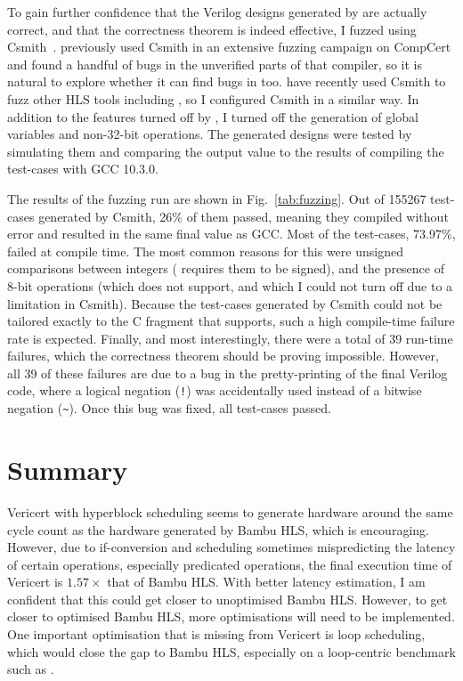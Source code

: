 \noindent To gain further confidence that the Verilog designs generated by
\vericert{} are actually correct, and that the correctness theorem is indeed
effective, I fuzzed \vericert{} using
Csmith~\cite{yang11_findin_under_bugs_c_compil}. \citeauthor{yang11_findin_under_bugs_c_compil}
previously used Csmith in an extensive fuzzing campaign on CompCert and found a
handful of bugs in the unverified parts of that compiler, so it is natural to
explore whether it can find bugs in \vericert{} too. \citet{herklotz21_esrhlst}
have recently used Csmith to fuzz other HLS tools including \legup{}, so I
configured Csmith in a similar way. In addition to the features turned off by
\citeauthor{herklotz21_esrhlst}, I turned off the generation of global variables
and non-32-bit operations. The generated designs were tested by simulating them
and comparing the output value to the results of compiling the test-cases with
GCC 10.3.0.

The results of the fuzzing run are shown in Fig.~\ref{tab:fuzzing}.  Out of
155267 test-cases generated by Csmith, 26\% of them passed, meaning they
compiled without error and resulted in the same final value as GCC. Most of the
test-cases, 73.97\%, failed at compile time.  The most common reasons for this
were unsigned comparisons between integers (\vericert{} requires them to be
signed), and the presence of 8-bit operations (which \vericert{} does not
support, and which I could not turn off due to a limitation in Csmith).  Because
the test-cases generated by Csmith could not be tailored exactly to the C
fragment that \vericert{} supports, such a high compile-time failure rate is
expected. Finally, and most interestingly, there were a total of 39 run-time
failures, which the correctness theorem should be proving impossible.  However,
all 39 of these failures are due to a bug in the pretty-printing of the final
Verilog code, where a logical negation (\texttt{!}) was accidentally used
instead of a bitwise negation (\verb|~|).  Once this bug was fixed, all
test-cases passed.

\section{Summary}

Vericert with hyperblock scheduling seems to generate hardware around the same
cycle count as the hardware generated by Bambu HLS, which is encouraging.
However, due to if-conversion and scheduling sometimes mispredicting the latency
of certain operations, especially predicated operations, the final execution
time of Vericert is $1.57\times$ that of Bambu HLS.  With better latency
estimation, I am confident that this could get closer to unoptimised Bambu HLS.
However, to get closer to optimised Bambu HLS, more optimisations will need to
be implemented.  One important optimisation that is missing from Vericert is
loop scheduling, which would close the gap to Bambu HLS, especially on a
loop-centric benchmark such as \polybench{}.

